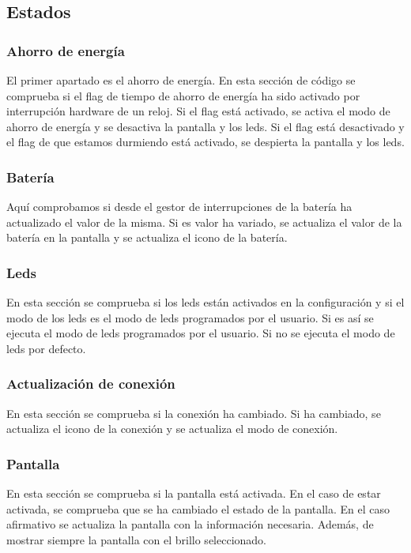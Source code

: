 \subsection{Estados}
\subsubsection{Ahorro de energía}
El primer apartado es el ahorro de energía. En esta sección de código se comprueba si el flag de tiempo de ahorro de energía ha sido activado por interrupción hardware de un reloj. Si el flag está activado, se activa el modo de ahorro de energía y se desactiva la pantalla y los leds. Si el flag está desactivado y el flag de que estamos durmiendo está activado, se despierta la pantalla y los leds.

\subsubsection{Batería}
Aquí comprobamos si desde el gestor de interrupciones de la batería ha actualizado el valor de la misma. Si es valor ha variado, se actualiza el valor de la batería en la pantalla y se actualiza el icono de la batería.

\subsubsection{Leds}
En esta sección se comprueba si los leds están activados en la configuración y si el modo de los leds es el modo de leds programados por el usuario. Si es así se ejecuta el modo de leds programados por el usuario. Si no se ejecuta el modo de leds por defecto.

\subsubsection{Actualización de conexión}
En esta sección se comprueba si la conexión ha cambiado. Si ha cambiado, se actualiza el icono de la conexión y se actualiza el modo de conexión.

\subsubsection{Pantalla}
En esta sección se comprueba si la pantalla está activada. En el caso de estar activada, se comprueba que se ha cambiado el estado de la pantalla. En el caso afirmativo se actualiza la pantalla con la información necesaria. Además, de mostrar siempre la pantalla con el brillo seleccionado.


